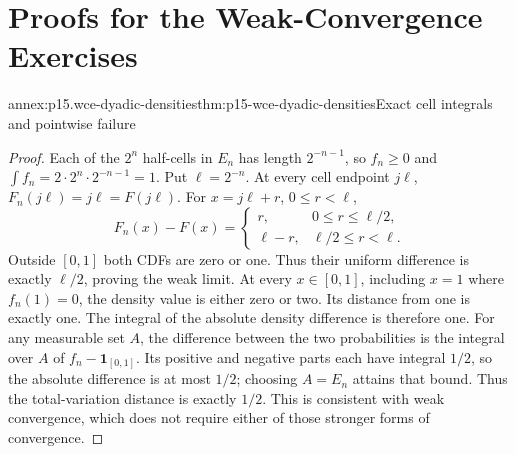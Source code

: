 \section{Proofs for the Weak-Convergence Exercises}
\label{sec:annex-p15-weak-convergence-exercises}

\begin{annexitem}{annex:p15.wce-dyadic-densities}{thm:p15-wce-dyadic-densities}{Exact cell integrals and pointwise failure}
\begin{proof}
Each of the \(2^n\) half-cells in \(E_n\) has length
\(2^{-n-1}\), so \(f_n\geq0\) and
\(\int f_n=2\cdot2^n\cdot2^{-n-1}=1\).
Put \(\ell=2^{-n}\). At every cell endpoint \(j\ell\),
\(F_n(j\ell)=j\ell=F(j\ell)\).
For \(x=j\ell+r\), \(0\leq r<\ell\),
\[
 F_n(x)-F(x)=
 \begin{cases}
  r,&0\leq r\leq\ell/2,\\
  \ell-r,&\ell/2\leq r<\ell.
 \end{cases}
 \]
Outside \([0,1]\) both CDFs are zero or one.
Thus their uniform difference is exactly \(\ell/2\), proving
the weak limit.
At every \(x\in[0,1]\), including \(x=1\) where \(f_n(1)=0\),
the density value is either zero or two. Its distance from one
is exactly one.
The integral of the absolute density difference is therefore one.
For any measurable set \(A\), the difference between the two
probabilities is the integral over \(A\) of
\(f_n-\mathbf1_{[0,1]}\). Its positive and negative parts
each have integral \(1/2\), so the absolute difference is at
most \(1/2\); choosing \(A=E_n\) attains that bound.
Thus the total-variation distance is exactly \(1/2\).
This is consistent with weak convergence,
which does not require either of those stronger forms of convergence.
\end{proof}
\end{annexitem}

